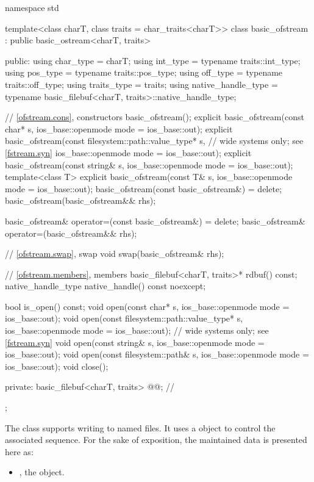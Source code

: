 %
\begin{codeblock}
namespace std {
  template<class charT, class traits = char_traits<charT>>
  class basic_ofstream : public basic_ostream<charT, traits> {
  public:
    using char_type   = charT;
    using int_type    = typename traits::int_type;
    using pos_type    = typename traits::pos_type;
    using off_type    = typename traits::off_type;
    using traits_type = traits;
    using native_handle_type = typename basic_filebuf<charT, traits>::native_handle_type;

    // \ref{ofstream.cons}, constructors
    basic_ofstream();
    explicit basic_ofstream(const char* s,
                            ios_base::openmode mode = ios_base::out);
    explicit basic_ofstream(const filesystem::path::value_type* s,  // wide systems only; see \ref{fstream.syn}
                            ios_base::openmode mode = ios_base::out);
    explicit basic_ofstream(const string& s,
                            ios_base::openmode mode = ios_base::out);
    template<class T>
      explicit basic_ofstream(const T& s, ios_base::openmode mode = ios_base::out);
    basic_ofstream(const basic_ofstream&) = delete;
    basic_ofstream(basic_ofstream&& rhs);

    basic_ofstream& operator=(const basic_ofstream&) = delete;
    basic_ofstream& operator=(basic_ofstream&& rhs);

    // \ref{ofstream.swap}, swap
    void swap(basic_ofstream& rhs);

    // \ref{ofstream.members}, members
    basic_filebuf<charT, traits>* rdbuf() const;
    native_handle_type native_handle() const noexcept;

    bool is_open() const;
    void open(const char* s, ios_base::openmode mode = ios_base::out);
    void open(const filesystem::path::value_type* s,
              ios_base::openmode mode = ios_base::out);     // wide systems only; see \ref{fstream.syn}
    void open(const string& s, ios_base::openmode mode = ios_base::out);
    void open(const filesystem::path& s, ios_base::openmode mode = ios_base::out);
    void close();

  private:
    basic_filebuf<charT, traits> @@;    // \expos
  };
}
\end{codeblock}

\pnum
The class
supports writing to named files.
It uses a
object to control the associated
sequence.
For the sake of exposition, the maintained data is presented here as:
\begin{itemize}
\item
{}, the  object.
\end{itemize}


